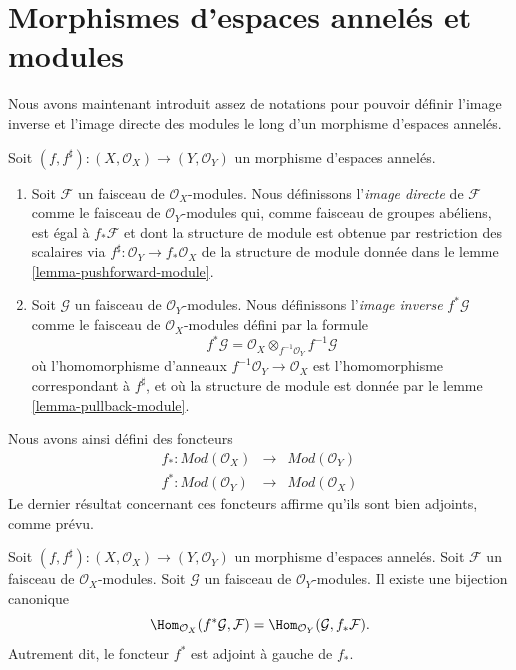 \section{Morphismes d'espaces annelés et modules}
\label{section-ringed-spaces-functoriality-modules}

\noindent
Nous avons maintenant introduit assez de notations pour pouvoir
définir l'image inverse et l'image directe des modules le long d'un morphisme
d'espaces annelés.

\begin{definition}
\label{definition-pushforward}
Soit $(f, f^\sharp) : (X, \mathcal{O}_X) \to (Y, \mathcal{O}_Y)$
un morphisme d'espaces annelés.
\begin{enumerate}
\item Soit $\mathcal{F}$ un faisceau de $\mathcal{O}_X$-modules.
Nous définissons l'{\it image directe} de $\mathcal{F}$ comme le
faisceau de $\mathcal{O}_Y$-modules qui, comme faisceau
de groupes abéliens, est égal à $f_*\mathcal{F}$ et dont la
structure de module est obtenue par restriction des scalaires
via $f^\sharp : \mathcal{O}_Y \to f_*\mathcal{O}_X$
de la structure de module donnée
dans le lemme \ref{lemma-pushforward-module}.
\item Soit $\mathcal{G}$ un faisceau de $\mathcal{O}_Y$-modules.
Nous définissons l'{\it image inverse} $f^*\mathcal{G}$ comme le
faisceau de $\mathcal{O}_X$-modules défini par la formule
$$
f^*\mathcal{G}
=
\mathcal{O}_X \otimes_{f^{-1}\mathcal{O}_Y} f^{-1}\mathcal{G}
$$
où l'homomorphisme d'anneaux $f^{-1}\mathcal{O}_Y \to \mathcal{O}_X$
est l'homomorphisme correspondant à $f^\sharp$, et où la structure de module
est donnée par le lemme \ref{lemma-pullback-module}.
\end{enumerate}
\end{definition}

\noindent
Nous avons ainsi défini des foncteurs
\begin{eqnarray*}
f_* : \textit{Mod}(\mathcal{O}_X)
& \longrightarrow &
\textit{Mod}(\mathcal{O}_Y) \\
f^* : \textit{Mod}(\mathcal{O}_Y)
& \longrightarrow &
\textit{Mod}(\mathcal{O}_X)
\end{eqnarray*}
Le dernier résultat concernant ces foncteurs affirme qu'ils sont bien
adjoints, comme prévu.

\begin{lemma}
\label{lemma-adjoint-pullback-pushforward-modules}
Soit $(f, f^\sharp) : (X, \mathcal{O}_X) \to (Y, \mathcal{O}_Y)$
un morphisme d'espaces annelés.
Soit $\mathcal{F}$ un faisceau de $\mathcal{O}_X$-modules.
Soit $\mathcal{G}$ un faisceau de $\mathcal{O}_Y$-modules.
Il existe une bijection canonique
$$
\Hom_{\mathcal{O}_X}(f^*\mathcal{G}, \mathcal{F})
=
\Hom_{\mathcal{O}_Y}(\mathcal{G}, f_*\mathcal{F}).
$$
Autrement dit, le foncteur $f^*$ est adjoint à gauche de
$f_*$.
\end{lemma}

